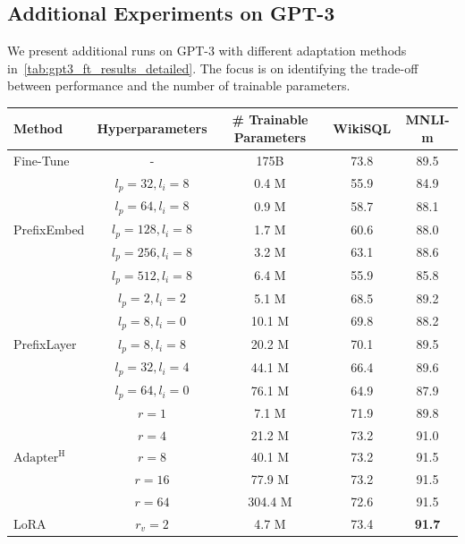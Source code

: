 \subsection{Additional Experiments on GPT-3}
\label{app:gpt3_extra}
We present additional runs on GPT-3 with different adaptation methods in~\autoref{tab:gpt3_ft_results_detailed}.
The focus is on identifying the trade-off between performance and the number of trainable parameters.
\begin{table}[h]
\centering
\begin{tabular}{l|c|c|c|c}
\hline
\toprule
Method    & Hyperparameters & \# Trainable Parameters &  WikiSQL & MNLI-m \\
\midrule
Fine-Tune & - & 175B &  73.8 & 89.5 \\
\midrule
\multirow{5}{*}{PrefixEmbed} & $l_p=32, l_i=8$ & 0.4 M & 55.9 & 84.9 \\
                             & $l_p=64, l_i=8$ & 0.9 M & 58.7 & 88.1 \\
                             & $l_p=128, l_i=8$ & 1.7 M & 60.6 & 88.0 \\
                             & $l_p=256, l_i=8$ & 3.2 M & 63.1 & 88.6 \\
                             & $l_p=512, l_i=8$ & 6.4 M & 55.9 & 85.8 \\
\midrule
\multirow{5}{*}{PrefixLayer} 
                             & $l_p=2, l_i=2$ & 5.1 M & 68.5 & 89.2 \\
                             & $l_p=8, l_i=0$ & 10.1 M & 69.8 & 88.2 \\
                             & $l_p=8, l_i=8$ & 20.2 M & 70.1 & 89.5 \\
                             & $l_p=32, l_i=4$ & 44.1 M & 66.4 & 89.6 \\
                             & $l_p=64, l_i=0$ & 76.1 M & 64.9 & 87.9 \\
\midrule
\multirow{5}{*}{$\text{Adapter}^{\text{H}}$} 
                             & $r=1$ & 7.1 M & 71.9 & 89.8 \\
                             & $r=4$ & 21.2 M & 73.2 & 91.0 \\
                             & $r=8$ & 40.1 M & 73.2 & 91.5 \\
                             & $r=16$& 77.9 M & 73.2 & 91.5 \\
                             & $r=64$& 304.4 M & 72.6 & 91.5 \\
\midrule
\multirow{5}{*}{LoRA}        & $r_{v}=2 $ & 4.7 M & 73.4 & \textbf{91.7} \\

\end{tabular}
\end{table}
